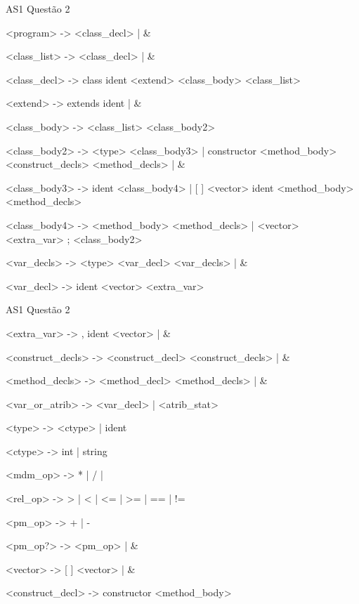 \documentclass[10pt]{beamer}
\begin{document}
\begin{frame}{AS1 Questão 2}

    <program> -> <class\_decl> | \&

    <class\_list> -> <class\_decl> | \&

<class\_decl> -> class ident <extend> <class\_body> <class\_list>

    <extend> -> extends ident | \&

<class\_body> -> { <class\_list> <class\_body2> }

    <class\_body2> -> <type> <class\_body3> | constructor <method\_body> <construct\_decls> <method\_decls> | \&

<class\_body3> -> ident <class\_body4> | [ ] <vector> ident <method\_body> <method\_decls>

<class\_body4> -> <method\_body> <method\_decls> | <vector> <extra\_var> ; <class\_body2>

<var\_decls> -> <type> <var\_decl> <var\_decls> | \&

<var\_decl> -> ident <vector> <extra\_var>

\end{frame}
\begin{frame}{AS1 Questão 2}

<extra\_var> -> , ident <vector> | \&

<construct\_decls> -> <construct\_decl> <construct\_decls> | \&

<method\_decls> -> <method\_decl> <method\_decls> | \&

<var\_or\_atrib> -> <var\_decl> | <atrib\_stat>

<type> -> <ctype> | ident

<ctype> -> int | string

<mdm\_op> -> * | / | %

<rel\_op> -> > | < | <= | >= | == | !=

<pm\_op> -> + | -

<pm\_op?> -> <pm\_op> | \&

<vector> -> [ ] <vector> | \&

<construct\_decl> -> constructor <method\_body>

\end{frame}
\end{document}
